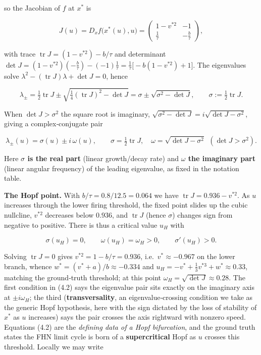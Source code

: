 \documentclass[
  11pt,
]{article}
\providecommand{\gt}{>}
\begin{document}
so the Jacobian of \(f\) at \(x^*\) is

\[
J(u)=D_xf\big(x^*(u),u\big)=
\begin{pmatrix} 1-v^{*2} & -1\\[2pt] \tfrac{1}{\tau} & -\tfrac{b}{\tau}\end{pmatrix},
\tag{4.1}
\]

with trace \(\operatorname{tr}J = (1-v^{*2})-b/\tau\) and determinant
\(\det J=(1-v^{*2})\!\left(-\tfrac{b}{\tau}\right)-(-1)\tfrac{1}{\tau}=\tfrac{1}{\tau}\big[-b(1-v^{*2})+1\big]\).
The eigenvalues solve
\(\lambda^2-(\operatorname{tr}J)\lambda+\det J=0\), hence

\[
\lambda_\pm=\tfrac12\operatorname{tr}J\pm\sqrt{\tfrac14(\operatorname{tr}J)^2-\det J}
=\sigma\pm\sqrt{\sigma^2-\det J},
\qquad \sigma:=\tfrac12\operatorname{tr}J .
\]

When \(\det J\gt \sigma^2\) the square root is imaginary,
\(\sqrt{\sigma^2-\det J}=i\sqrt{\det J-\sigma^2}\), giving a
complex‑conjugate pair

\[
\lambda_\pm(u)=\sigma(u)\pm i\,\omega(u),\qquad
\sigma=\tfrac12\operatorname{tr}J,\quad
\omega=\sqrt{\det J-\sigma^2}\ \ (\det J\gt \sigma^2).
\]

Here \textbf{\(\sigma\) is the real part} (linear growth/decay rate) and
\textbf{\(\omega\) the imaginary part} (linear angular frequency) of the
leading eigenvalue, as fixed in the notation table.

\textbf{The Hopf point.} With \(b/\tau=0.8/12.5=0.064\) we have
\(\operatorname{tr}J=0.936-v^{*2}\). As \(u\) increases through the
lower firing threshold, the fixed point slides up the cubic nullcline,
\(v^{*2}\) decreases below \(0.936\), and \(\operatorname{tr}J\) (hence
\(\sigma\)) changes sign from negative to positive. There is thus a
critical value \(u_H\) with

\[
\sigma(u_H)=0,\qquad \omega(u_H)=\omega_H\gt 0,\qquad \sigma'(u_H)\gt 0 .
\tag{4.2}
\]

Solving \(\operatorname{tr}J=0\) gives \(v^{*2}=1-b/\tau=0.936\),
i.e.~\(v^*\approx-0.967\) on the lower branch, whence
\(w^*=(v^*+a)/b\approx-0.334\) and
\(u_H=-v^*+\tfrac13 v^{*3}+w^*\approx 0.33\), matching the ground‑truth
threshold; at this point \(\omega_H=\sqrt{\det J}\approx0.28\). The
first condition in (4.2) says the eigenvalue pair sits exactly on the
imaginary axis at \(\pm i\omega_H\); the third (\textbf{transversality},
an eigenvalue‑crossing condition we take as the generic Hopf hypothesis,
here with the sign dictated by the loss of stability of \(x^*\) as \(u\)
increases) says the pair crosses the axis rightward with nonzero speed.
Equations (4.2) are the \emph{defining data of a Hopf bifurcation}, and
the ground truth states the FHN limit cycle is born of a
\textbf{supercritical} Hopf as \(u\) crosses this threshold. Locally we
may write
\end{document}

